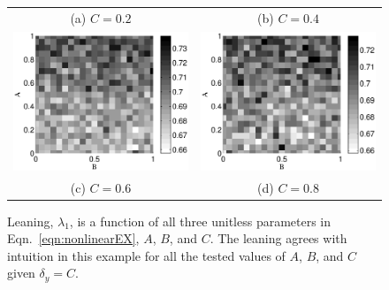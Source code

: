 \documentclass[twocolumn,aps,pre,groupedaddress]{revtex4-1}
\begin{document}
\begin{figure}[ht]
\begin{tabular}{cc}
(a) $C=0.2$ & (b) $C=0.4$ \\
\includegraphics[scale=0.30]{NonlinearCyclicexample_BxytolC06.eps} &
\includegraphics[scale=0.30]{NonlinearCyclicexample_BxytolC08.eps} \\
(c) $C=0.6$ & (d) $C=0.8$ \\
\end{tabular}
\caption{Leaning, $\lambda_1$, is a function of all three unitless parameters in Eqn.\ \ref{eqn:nonlinearEX}, $A$, $B$, and $C$.  The leaning agrees with intuition in this example for all the tested values of $A$, $B$, and $C$ given $\delta_y=C$.}
\label{fig:nonlin1}
\end{figure}
\end{document}
